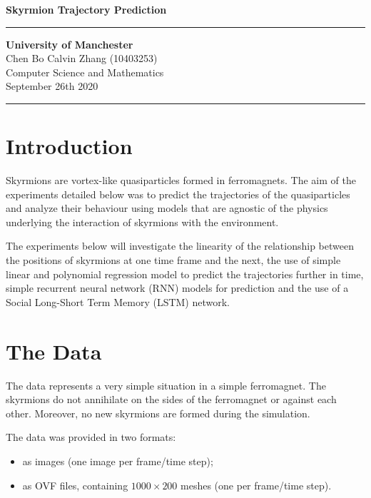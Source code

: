 \documentclass[a4paper]{article}
\begin{document}
  \begin{titlepage}
    \begin{center}
      \vfill
      \textbf{\huge{Skyrmion Trajectory Prediction}} \\
      \vfill
      \hrule
      \vspace{5pt}
      \textbf{\large{University of Manchester}} \\
      \large{Chen Bo Calvin Zhang (10403253)} \\
      \large{Computer Science and Mathematics} \\
      \large{September 26th 2020} \\
      \vspace{5pt}
      \hrule
      \vfill
    \end{center}
  \end{titlepage} 
  
  \tableofcontents
  
  \newpage
  
  \section{Introduction}
  Skyrmions are vortex-like quasiparticles formed in ferromagnets. The aim of the experiments detailed below was to predict the trajectories of the quasiparticles and analyze their behaviour using models that are agnostic of the physics underlying the interaction of skyrmions with the environment.

  The experiments below will investigate the linearity of the relationship between the positions of skyrmions at one time frame and the next, the use of simple linear and polynomial regression model to predict the trajectories further in time, simple recurrent neural network (RNN) models for prediction and the use of a Social Long-Short Term Memory (LSTM) network.

  \section{The Data}
  The data represents a very simple situation in a simple ferromagnet. The skyrmions do not annihilate on the sides of the ferromagnet or against each other. Moreover, no new skyrmions are formed during the simulation.

  The data was provided in two formats:
  \begin{itemize}
    \item as images (one image per frame/time step);
    \item as OVF files, containing $1000\times200$ meshes (one per frame/time step).
  \end{itemize}
\end{document}
